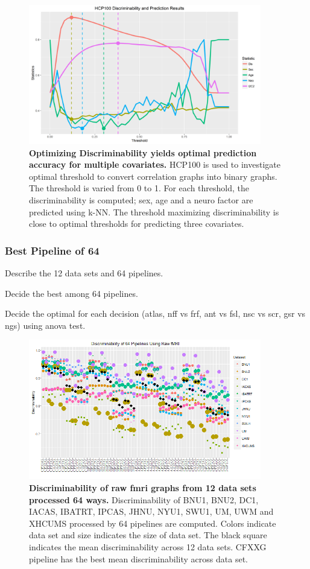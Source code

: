 \documentclass{article}
\begin{document}
\begin{figure}[ht!]
\includegraphics[width=4.0in]{../Figs/hcp_2.png}
\caption{{\bf Optimizing Discriminability yields optimal prediction accuracy for multiple covariates.} HCP100 is used to investigate optimal threshold to convert correlation graphs into binary graphs. The threshold is varied from 0 to 1. For each threshold, the discriminability is computed;  sex, age and a neuro factor are predicted using k-NN. The threshold maximizing discriminability is close to optimal thresholds for predicting three covariates. }
\label{fig:4}
\end{figure}

\subsubsection{Best Pipeline of 64}
 Describe the 12 data sets and 64 pipelines. 

 Decide the best among 64 pipelines.

 Decide the optimal for each decision (atlas, nff vs frf, ant vs fsl, nsc vs scr, gsr vs ngs) using anova test.
\begin{figure}[ht!]
	\includegraphics[width=4.0in]{../Figs/64_pipelines_raw.png}
	\caption{{\bf Discriminability of raw fmri graphs from 12 data sets processed 64 ways.}  Discriminability of BNU1, BNU2, DC1, IACAS, IBATRT, IPCAS, JHNU, NYU1, SWU1, UM, UWM and XHCUMS processed by 64 pipelines are computed. Colors indicate data set and size indicates the size of data set. The black square indicates the mean discriminability across 12 data sets. CFXXG pipeline has the best mean discriminability across data set. }
	\label{fig:6}
\end{figure}
\end{document}
